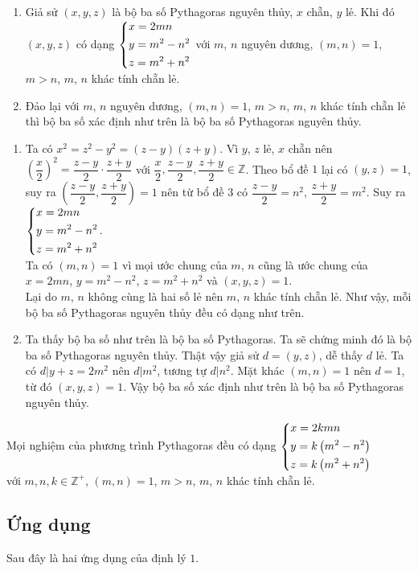 \begin{dl}\begin{enumerate}
		\item Giả sử $(x,y,z)$ là bộ ba số Pythagoras nguyên thủy, $x$ chẵn, $y$ lẻ. Khi đó $(x,y,z)$ có dạng $\left\{\begin{aligned}&x=2mn\\&y= m^2 -n^2\\&z= m^2 +n^2\end{aligned}\right.$ với $m$, $n$ nguyên dương, $(m,n)=1$, $m>n$, $m$, $n$ khác tính chẵn lẻ.
		\item Đảo lại với $m$, $n$ nguyên dương, $(m,n)=1$, $m>n$, $m$, $n$ khác tính chẵn lẻ thì bộ ba số xác định như trên là bộ ba số Pythagoras nguyên thủy.
	\end{enumerate}
	\begin{enumerate}
		\item Ta có $x^2 = z^2 -y^2 = (z-y)(z+y).$
		Vì $y$, $z$ lẻ, $x$ chẵn nên $\left( \dfrac{x}{2}\right) ^2 = \dfrac{z-y}{2} \cdot \dfrac{z+y}{2}$ với $\dfrac{x}{2}, \dfrac{z-y}{2}, \dfrac{z+y}{2} \in \mathbb{Z}$. Theo bổ đề $1$ lại có $(y,z)=1$, suy ra $\left( \dfrac{z-y}{2}, \dfrac{z+y}{2}\right) =1 $ nên từ bổ đề $3$ có $\dfrac{z-y}{2} = n^2$, $\dfrac{z+y}{2} = m^2$. Suy ra $\left\{\begin{aligned}&x=2mn\\&y= m^2 -n^2\\&z= m^2 +n^2\end{aligned}\right.$.\\
		Ta có $(m,n)=1$ vì mọi ước chung của $m$, $n$ cũng là ước chung của $x=2mn$, $y=m^2 - n^2$, $z=m^2 + n^2$ và $(x,y,z)=1$.\\
		Lại do $m$, $n$ không cùng là hai số lẻ nên $m$, $n$ khác tính chẵn lẻ. Như vậy, mỗi bộ ba số Pythagoras nguyên thủy đều có dạng như trên.
		\item Ta thấy bộ ba số như trên là bộ ba số Pythagoras. Ta sẽ chứng minh đó là bộ ba số Pythagoras nguyên thủy. Thật vậy giả sử $d=(y,z)$, dễ thấy $d$ lẻ. Ta có $d|y+z = 2m^2$ nên $d| m^2$, tương tự $d|n^2$. Mặt khác $(m,n)=1$ nên $d=1$, từ đó $(x,y,z)=1$. Vậy bộ ba số xác định như trên là bộ ba số Pythagoras nguyên thủy.
	\end{enumerate}
\end{dl}

 Mọi nghiệm của phương trình Pythagoras đều có dạng $\left\{\begin{aligned}&x=2kmn\\&y= k \left( m^2 -n^2\right) \\&z=k\left(  m^2 +n^2\right)\end{aligned}\right. $ \\ với $m,n,k \in \mathbb{Z}^+$, $(m,n)=1$, $m>n$, $m$, $n$ khác tính chẵn lẻ.

\subsection{Ứng dụng} 
Sau đây là hai ứng dụng của định lý $1$.

